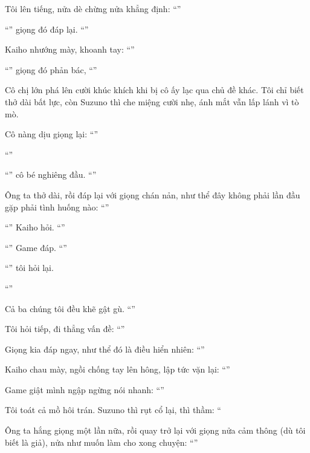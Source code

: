 \documentclass[../main.tex]{subfiles}
\begin{document}
Tôi lên tiếng, nửa dè chừng nửa khẳng định: ``''

``'' giọng đó đáp lại. ``''

Kaiho nhướng mày, khoanh tay: ``''

``'' giọng đó phản bác, ``''

Cô chị lớn phá lên cười khúc khích khi bị cô ấy lạc qua chủ đề khác. Tôi chỉ biết thở dài bất lực, còn Suzuno thì che miệng cười nhẹ, ánh mắt vẫn lấp lánh vì tò mò.

Cô nàng dịu giọng lại: ``''

``''

``'' cô bé nghiêng đầu. ``''

Ông ta thở dài, rồi đáp lại với giọng chán nản, như thể đây không phải lần đầu gặp phải tình huống nào: ``''

``'' Kaiho hỏi. ``''

``'' Game đáp. ``''

``'' tôi hỏi lại.

``''

Cả ba chúng tôi đều khẽ gật gù. ``''

Tôi hỏi tiếp, đi thẳng vấn đề: ``''

Giọng kia đáp ngay, như thể đó là điều hiển nhiên: ``''

Kaiho chau mày, ngồi chống tay lên hông, lập tức vặn lại: ``''

Game giật mình ngập ngừng nói nhanh: ``''

Tôi toát cả mồ hôi trán. Suzuno thì rụt cổ lại, thì thầm: ``

Ông ta hắng giọng một lần nữa, rồi quay trở lại với giọng nửa cảm thông (dù tôi biết là giả), nửa như muốn làm cho xong chuyện: ``''
\end{document}
